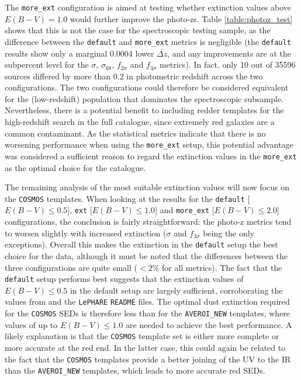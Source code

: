 

The \texttt{more\_ext} configuration is aimed at testing whether extinction values above $E(B-V)=1.0$ would further improve the photo-zs. Table \ref{table:photoz_test} shows that this is not the case for the spectroscopic testing sample, as the difference between the \texttt{default} and \texttt{more\_ext} metrics is negligible (the \texttt{default} results show only a marginal 0.0004 lower $\overbar{\Delta z}$, and any improvements are at the subpercent level for the $\sigma$, $\sigma_{68}$, $f_{2\sigma}$ and $f_{3\sigma}$ metrics). In fact, only 10 out of \num{35596} sources differed by more than 0.2 in photometric redshift across the two configurations. The two configurations could therefore be considered equivalent for the (low-redshift) population that dominates the spectroscopic subsample. Nevertheless, there is a potential benefit to including redder templates for the high-redshift search in the full catalogue, since extremely red galaxies are a common contaminant. As the statistical metrics indicate that there is no worsening performance when using the \texttt{more\_ext} setup, this potential advantage was considered a sufficient reason to regard the extinction values in the \texttt{more\_ext} as the optimal choice for the \DESVIDEO catalogue. \par 


The remaining analysis of the most suitable extinction values will now focus on the \texttt{COSMOS} templates.  When looking at the results for the \texttt{default} [$E(B-V)\leq0.5$], \texttt{ext} [$E(B-V)\leq1.0$] and \texttt{more\_ext} [$E(B-V)\leq2.0$] configurations, the conclusion is fairly straightforward: the photo-z metrics tend to worsen slightly with increased extinction ($\sigma$ and $f_{3\sigma}$ being the only exceptions). Overall this makes the extinction in the \texttt{default} setup the best choice for the \DESVIDEO data, although it must be noted that the differences between the three configurations are quite small ($<2\%$ for all metrics). The fact that the \texttt{default} setup performs best suggests that the extinction values of $E(B-V)\leq0.5$ in the default setup are largely sufficient, corroborating the values from \cite{2009ApJ...690.1236I} and the \texttt{LePHARE} \texttt{README} files. The optimal dust extinction required for the \texttt{COSMOS} SEDs is therefore less than for the \texttt{AVEROI\_NEW} templates, where values of up to $E(B-V)\leq1.0$ are needed to achieve the best performance. A likely explanation is that the \texttt{COSMOS} template set is either more complete or more accurate at the red end. In the latter case, this could again be related to the fact that the \texttt{COSMOS} templates provide a better joining of the UV to the IR than the \texttt{AVEROI\_NEW} templates, which leads to more accurate red SEDs. \par 


